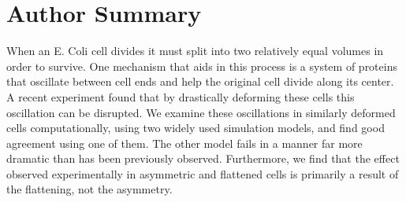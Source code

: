 \documentclass[10pt,letterpaper]{article}
\begin{document}
\section*{Author Summary}
  When an E. Coli cell divides it must split into two relatively equal
  volumes in order to survive.  One mechanism that aids in this
  process is a system of proteins that oscillate between cell ends and
  help the original cell divide along its center.  A recent
  experiment found that by drastically deforming these cells this
  oscillation can be disrupted.  We examine these oscillations in
  similarly deformed cells computationally, using two widely used
  simulation models, and find good agreement using one of them.  The
  other model fails in a manner far more dramatic than has been
  previously observed.  Furthermore, we find that the effect observed
  experimentally in asymmetric and flattened cells is primarily a
  result of the flattening, not the asymmetry.

\linenumbers
\end{document}
